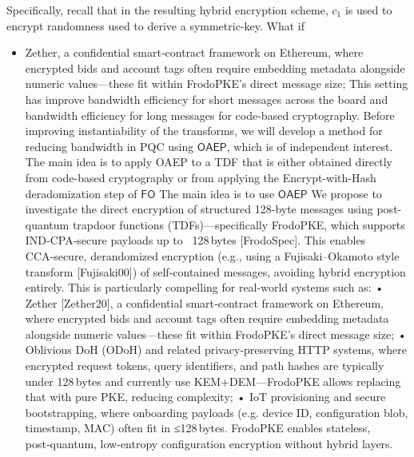 {Specifically, recall that in the resulting hybrid encryption scheme, $c_1$ is used to encrypt randomness used to derive a symmetric-key. What if 

\iffalse
\iffalse
\begin{itemize}
    \item Zether, a confidential smart‑contract framework on Ethereum, where encrypted bids and account tags often require embedding metadata alongside numeric values—these fit within FrodoPKE’s direct message size;
This setting has 
improve bandwidth efficiency for short messages across the board and bandwidth efficiency for long messages for code-based cryptography.
Before improving instantiability of the transforms, we will develop a method for reducing bandwidth in PQC using $\mathsf{OAEP}$, which is of independent interest. The main idea is to apply OAEP to a TDF that is either obtained directly from code-based cryptography or from applying the Encrypt-with-Hash deradomization step of $\mathsf{FO}$
The main idea is to use $\mathsf{OAEP}$
We propose to investigate the direct encryption of structured 128-byte messages using post-quantum trapdoor functions (TDFs)—specifically FrodoPKE, which supports IND‑CPA‑secure payloads up to ~128 bytes [FrodoSpec]. This enables CCA‑secure, derandomized encryption (e.g., using a Fujisaki–Okamoto style transform [Fujisaki00]) of self‑contained messages, avoiding hybrid encryption entirely.
This is particularly compelling for real-world systems such as:
• Zether [Zether20], a confidential smart‑contract framework on Ethereum, where encrypted bids and account tags often require embedding metadata alongside numeric values—these fit within FrodoPKE’s direct message size;
• Oblivious DoH (ODoH) and related privacy‑preserving HTTP systems, where encrypted request tokens, query identifiers, and path hashes are typically under 128 bytes and currently use KEM+DEM—FrodoPKE allows replacing that with pure PKE, reducing complexity;
• IoT provisioning and secure bootstrapping, where onboarding payloads (e.g. device ID, configuration blob, timestamp, MAC) often fit in ≤128 bytes. FrodoPKE enables stateless, post‑quantum, low-entropy configuration encryption without hybrid layers.

\end{itemize}}
